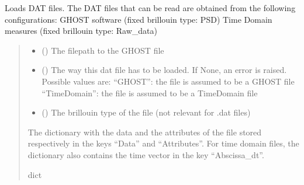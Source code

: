 \documentclass[letterpaper,10pt,english]{sphinxmanual}
\begin{document}
\begin{fulllineitems}
\label{\detokenize{source/HDF5_BLS:HDF5_BLS.load_data.load_dat_file}}
\pysigstartsignatures
\pysiglinewithargsret
{}
{\sphinxparamcomma {}\sphinxparamcomma {}\sphinxparamcomma {}}
{}
\pysigstopsignatures
\sphinxAtStartPar
Loads DAT files. The DAT files that can be read are obtained from the following configurations:
\sphinxhyphen{} GHOST software (fixed brillouin type: PSD)
\sphinxhyphen{} Time Domain measures (fixed brillouin type: Raw\_data)
\begin{quote}\begin{description}
\begin{itemize}
\item {} 
\sphinxAtStartPar
{} () \textendash{} The filepath to the GHOST file

\item {} 
\sphinxAtStartPar
{} (\sphinxstyleliteralemphasis{\sphinxupquote{, }}) \textendash{} The way this dat file has to be loaded. If None, an error is raised. Possible values are:
\sphinxhyphen{} “GHOST”: the file is assumed to be a GHOST file
\sphinxhyphen{} “TimeDomain”: the file is assumed to be a TimeDomain file

\item {} 
\sphinxAtStartPar
{} (\sphinxstyleliteralemphasis{\sphinxupquote{, }}) \textendash{} The brillouin type of the file (not relevant for .dat files)

\end{itemize}

\sphinxAtStartPar
The dictionary with the data and the attributes of the file stored respectively in the keys “Data” and “Attributes”. For time domain files, the dictionary also contains the time vector in the key “Abscissa\_dt”.

\sphinxAtStartPar
dict

\end{description}\end{quote}

\end{fulllineitems}
\end{document}
